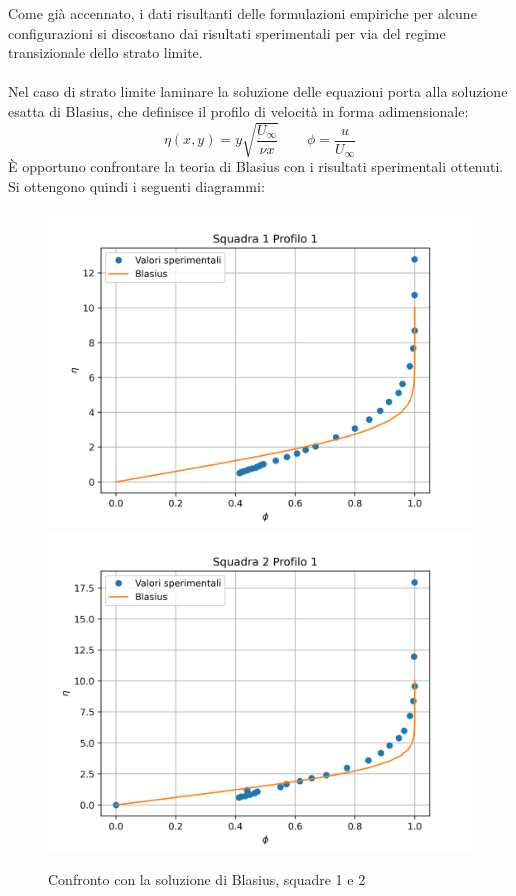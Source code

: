 \noindent Come già accennato, i dati risultanti delle formulazioni empiriche per alcune configurazioni si discostano dai risultati sperimentali per via del regime transizionale dello strato limite.\\\\
Nel caso di strato limite laminare la soluzione delle equazioni porta alla soluzione esatta di Blasius, che definisce il profilo di velocità in forma adimensionale:
\begin{equation*}
    \eta(x,y) = y\sqrt{\frac{U_\infty}{\nu x}} \qquad \phi = \frac{u}{U_\infty}
\end{equation*}
È opportuno confrontare la teoria di Blasius con i risultati sperimentali ottenuti. Si ottengono quindi i seguenti diagrammi:
\begin{figure}[H]
    \centering
    \includegraphics[width=.49\textwidth]{images/9/sq1p1_blasius.png}
    \includegraphics[width=.49\textwidth]{images/9/sq2p1_blasius.png}
    \caption{Confronto con la soluzione di Blasius, squadre 1 e 2}
\end{figure}

